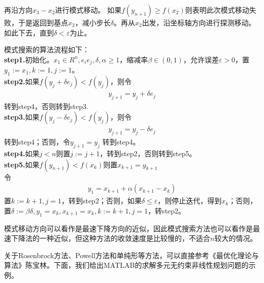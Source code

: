         再沿方向$x_3-x_2$进行模式移动。
        如果$f(y_{n+1}) \geqslant f(x_2)$则表明此次模式移动失败，于是返回到基点$x_2$，减小步长$\delta$。再从$x_2$出发，沿坐标轴方向进行探测移动。如此下去，直到$\delta < \varepsilon$为止。
        \par
        模式搜索的算法流程如下：\\
        \textbf{step1.}初始化。$x_1 \in R^n,e_ie_j,\delta,\alpha \geqslant 1$，缩减率$\beta \in (0,1)$，允许误差$\varepsilon > 0$，置$y_1:=x_1,k:=1,j:=1$。\\
        \textbf{step2.}如果$f(y_j+\delta e_j) < f(y_j)$，则令
        \begin{align*}
         y_{j+1}=y_j+\delta e_j
        \end{align*}
        转到step4，否则转到step3.\\
        \textbf{step3.}如果$f(y_j-\delta e_j) < f(y_j)$，则令
        \begin{align*}
         y_{j+1}=y_j-\delta e_j
        \end{align*}
        转到step4；否则，令$y_{j+1}=y_j$
        转到step4。\\
        \textbf{step4.}如果$j<n$则置$j:=j+1$，转到step2，否则转到step5。\\
        \textbf{step5.}如果$f(y_{n+1}) < f(x_k)$则置$x_{k+1}=y_{k+1}$\\
        令
        \begin{align*}
         y_1=x_{k+1}+\alpha(x_{k+1}-x_k)
        \end{align*}
        置$k:=k+1,j=1$，转到step2；否则，如果$\delta \leqslant \varepsilon$，则停止迭代，得到$x_k$；否则，置$\delta :=\beta \delta,y_1=x_k,x_{k+1}=x_k,k:=k+1,j=1$，转step2。\par
        模式移动方向可以看作是最速下降方向的近似，因此模式搜索方法也可以看作是最速下降法的一种近似，但这种方法的收敛速度是比较慢的，不适合$n$较大的情况。
        \par
        关于Rosenbrock方法、Powell方法和单纯形等方法，可以直接参考《最优化理论与算法》陈宝林。下面，我们给出MATLAB的求解多元无约束非线性规划问题的示例。

